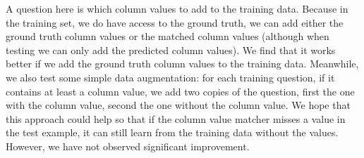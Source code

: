 A question here is which column values to add to the training data. Because in the training set, we do have access to the ground truth, we can add either the ground truth column values or the matched column values (although when testing we can only add the predicted column values). We find that it works better if we add the ground truth column values to the training data. Meanwhile, we also test some simple data augmentation: for each training question, if it contains at least a column value, we add two copies of the question, first the one with the column value, second the one without the column value. We hope that this approach could help so that if the column value matcher misses a value in the test example, it can still learn from the training data without the values. However, we have not observed significant improvement. 
